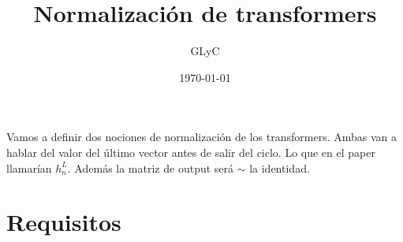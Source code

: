 \documentclass{article}
\title{Normalización de transformers}
\author{GLyC}
\date{\today}
\begin{document}
\maketitle

Vamos a definir dos nociones de normalización de los transformers. Ambas van a hablar del valor del último vector antes de salir del ciclo. Lo que en el paper llamarían $h_n^L$. Además la matriz de output será $\sim$ la identidad.









\section*{Requisitos}
\end{document}
